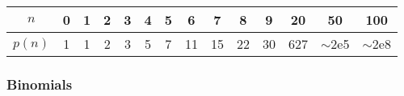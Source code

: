 		\begin{center}
		\begin{tabular}{c|c@{\ }c@{\ }c@{\ }c@{\ }c@{\ }c@{\ }c@{\ }c@{\ }c@{\ }c@{\ }c@{\ }c@{\ }c}
			$n$    & 0 & 1 & 2 & 3 & 4 & 5 & 6  & 7  & 8  & 9  & 20  & 50  & 100 \\ \hline
			$p(n)$ & 1 & 1 & 2 & 3 & 5 & 7 & 11 & 15 & 22 & 30 & 627 & $\mathtt{\sim}$2e5 & $\mathtt{\sim}$2e8 \\
		\end{tabular}
		\end{center}

	\subsubsection{Binomials}
